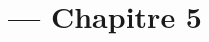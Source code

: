 
\title{\TSwiftTitle{} --- Chapitre 5}

\newcommand{\TSwiftRoot}[0]{../..} %



\maketitle

\tableofcontents




